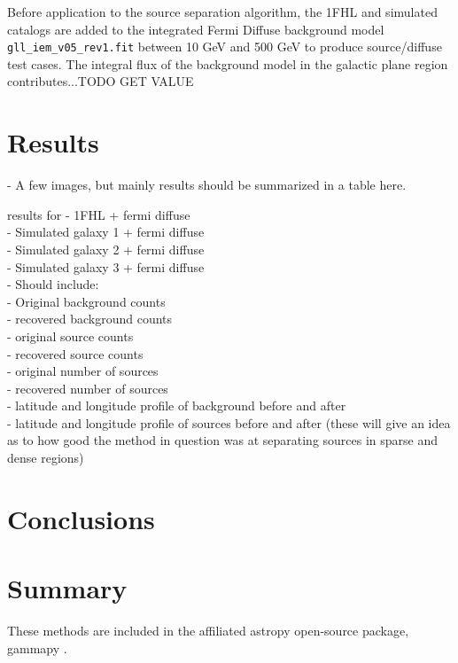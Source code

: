 \documentclass{PoS}
\begin{document}
Before application to the source separation algorithm, the 1FHL and simulated catalogs are added to the integrated Fermi Diffuse background model \verb|gll_iem_v05_rev1.fit| between 10 GeV and 500 GeV to produce source/diffuse test cases. The integral flux of the background model in the galactic plane region contributes...TODO GET VALUE


\section{Results}
- A few images, but mainly results should be summarized in a table here.

results for
- 1FHL + fermi diffuse\\
- Simulated galaxy 1 + fermi diffuse\\
- Simulated galaxy 2 + fermi diffuse\\
- Simulated galaxy 3 + fermi diffuse\\

- Should include:\\
    - Original background counts\\
    - recovered background counts\\
    - original source counts\\
    - recovered source counts\\
    - original number of sources\\
    - recovered number of sources\\
    - latitude and longitude profile of background before and after\\
    - latitude and longitude profile of sources before and after
        (these will give an idea as to how good the method in question was at separating sources in sparse and dense regions)
    
\section{Conclusions}


\section{Summary}
These methods are included in the affiliated astropy open-source package, gammapy \cite{Deil}.

\begin{thebibliography}{99}





\end{thebibliography}
\end{document}
